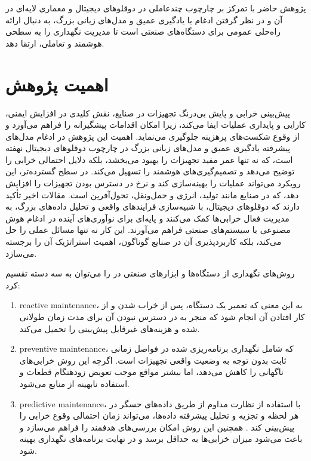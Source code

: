  پژوهش حاضر با تمرکز بر چارچوب چندعاملی در دوقلوهای دیجیتال و معماری لایه‌ای در آن و در نظر گرفتن ادغام با یادگیری عمیق و مدل‌های زبانی بزرگ، به دنبال ارائه راه‌حلی عمومی برای دستگاه‌های صنعتی است تا مدیریت نگهداری را به سطحی هوشمند و تعاملی، ارتقا دهد.
  
  
  
\section{اهمیت پژوهش}

پیش‌بینی خرابی و پایش بی‌درنگ تجهیزات در صنایع، نقش کلیدی در افزایش ایمنی، کارایی و پایداری عملیات ایفا می‌کند، زیرا امکان اقدامات پیشگیرانه را فراهم می‌آورد و از وقوع شکست‌های پرهزینه جلوگیری می‌نماید.
 اهمیت این پژوهش در ادغام مدل‌های پیشرفته یادگیری عمیق و مدل‌های زبانی بزرگ در چارچوب دوقلوهای دیجیتال نهفته است، که نه تنها عمر مفید تجهیزات را بهبود می‌بخشد، بلکه دلایل احتمالی خرابی را توضیح می‌دهد و تصمیم‌گیری‌های هوشمند را تسهیل می‌کند.
  در سطح گسترده‌تر، این رویکرد می‌تواند عملیات را بهینه‌سازی کند و نرخ در دسترس بودن تجهیزات را افزایش دهد، که در صنایع مانند تولید، انرژی و حمل‌ونقل، تحول‌آفرین است. 
  مقالات اخیر تأکید دارند که دوقلوهای دیجیتال، با شبیه‌سازی فرایند‌های واقعی و تحلیل داده‌های بزرگ، به مدیریت فعال خرابی‌ها کمک می‌کنند و پایه‌ای برای نوآوری‌های آینده در ادغام هوش مصنوعی با سیستم‌های صنعتی فراهم می‌آورند. این کار نه تنها مسائل عملی را حل می‌کند، بلکه کاربردپذیری آن در صنایع گوناگون، اهمیت استراتژیک آن را برجسته می‌سازد.


روش‌‌های نگهداری از دستگاه‌ها و ابزار‌های صنعتی در را می‌توان به سه دسته تقسیم کرد\cite{ismail2025systematic}: 

\begin{enumerate}
	\item 
\gls{reactive maintenance}، به این معنی که تعمیر یک دستگاه، پس از خراب شدن و از کار افتادن آن انجام شود که منجر به در دسترس نبودن آن برای مدت زمان طولانی شده و هزینه‌های غیرقابل پیش‌بینی را تحمیل می‌کند.
	\item 
\gls{preventive maintenance}، که شامل نگهداری برنامه‌ریزی شده در فواصل زمانی ثابت بدون توجه به وضعیت واقعی تجهیزات است. اگرچه این روش خرابی‌های ناگهانی را کاهش می‌دهد، اما بیشتر مواقع موجب تعویض زودهنگام قطعات و استفاده نابهینه از منابع می‌شود.
	\item 
\gls{predictive maintenance}، با استفاده از نظارت مداوم از طریق داده‌های حسگر در هر لحظه و تجزیه و تحلیل پیشرفته داده‌ها، می‌تواند زمان احتمالی وقوع خرابی را پیش‌بینی کند .
همچنین این روش امکان بررسی‌های هدفمند را فراهم می‌سازد و باعث می‌شود میزان خرابی‌ها به حداقل برسد و در نهایت برنامه‌های نگهداری بهینه شود\cite{rojek2023artificial}.
\end{enumerate}

